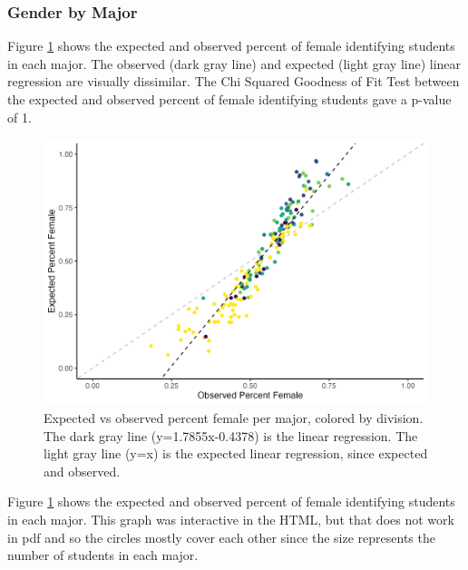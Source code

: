 \documentclass{article}
\begin{document}
\subsubsection{Gender by Major}\label{gender-by-major-1}

Figure \ref{fig:expvsobsgxm} shows the expected and observed percent of female identifying students in each major. The observed (dark gray line) and expected (light gray line) linear regression are visually dissimilar. The Chi Squared Goodness of Fit Test between the expected and observed percent of female identifying students gave a p-value of 1.



\begin{figure}

{\centering \includegraphics[width=0.9\linewidth]{obs_vs_exp_gxm} 

}

\caption{Expected vs observed percent female per major, colored by division. The dark gray line (y=1.7855x-0.4378) is the linear regression. The light gray line (y=x) is the expected linear regression, since expected and observed.}\label{fig:expvsobsgxm}
\end{figure}

Figure \ref{fig:expvsobsgxm} shows the expected and observed percent of female identifying students in each major. This graph was interactive in the HTML, but that does not work in pdf and so the circles mostly cover each other since the size represents the number of students in each major.
\end{document}
